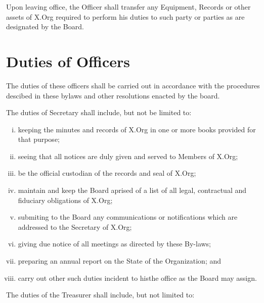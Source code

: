 \documentclass[10pt, english]{bylaws}
\begin{document}
Upon leaving office, the Officer shall transfer any Equipment, Records or other
assets of X.Org required to perform his duties to such party or parties as are
designated by the Board.

\section{Duties of Officers}
The duties of these officers shall be carried out in accordance with the
procedures descibed in these bylaws and other resolutions enacted by the board.

The duties of Secretary shall include, but not be limited to:

\begin{enumerate}[(i)\hspace{.2cm}]
	\item keeping the minutes and records of X.Org in one or more books
	provided for that purpose;

	\item seeing that all notices are duly given and served to Members of
	X.Org;

	\item be the official custodian of the records and seal of X.Org;

	\item maintain and keep the Board aprised of a list of all legal,
	contractual and fiduciary obligations of X.Org;

	\item submiting to the Board any communications or notifications which
	are addressed to the Secretary of X.Org;

	\item giving due notice of all meetings as directed by these By-laws;

	\item preparing an annual report on the State of the Organization; and

	\item carry out other such duties incident to histhe office as the Board
	may assign.
\end{enumerate}

The duties of the Treasurer shall include, but not limited to:
\end{document}
